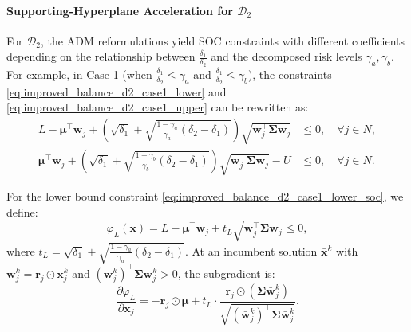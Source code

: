 \documentclass[preprint,12pt,authoryear]{elsarticle}
\begin{document}
\paragraph{Supporting-Hyperplane Acceleration for $\mathcal{D}_2$}
For $\mathcal{D}_2$, the ADM reformulations yield SOC constraints with different coefficients depending on the relationship between $\frac{\delta_1}{\delta_2}$ and the decomposed risk levels $\gamma_a, \gamma_b$. For example, in Case 1 (when $\frac{\delta_1}{\delta_2} \leqslant \gamma_a$ and $\frac{\delta_1}{\delta_2} \leqslant \gamma_b$), the constraints \eqref{eq:improved_balance_d2_case1_lower} and \eqref{eq:improved_balance_d2_case1_upper} can be rewritten as:
\begin{align}
L - \boldsymbol{\mu}^\top \mathbf{w}_j + \left(\sqrt{\delta_1} + \sqrt{\frac{1 - \gamma_a}{\gamma_a} (\delta_2 - \delta_1)}\right) \sqrt{\mathbf{w}_j^\top \boldsymbol{\Sigma} \mathbf{w}_j} &\leqslant 0, \quad \forall j \in N, \label{eq:improved_balance_d2_case1_lower_soc} \\
\boldsymbol{\mu}^\top \mathbf{w}_j + \left(\sqrt{\delta_1} + \sqrt{\frac{1 - \gamma_b}{\gamma_b} (\delta_2 - \delta_1)}\right) \sqrt{\mathbf{w}_j^\top \boldsymbol{\Sigma} \mathbf{w}_j} - U &\leqslant 0, \quad \forall j \in N. \label{eq:improved_balance_d2_case1_upper_soc}
\end{align}

For the lower bound constraint \eqref{eq:improved_balance_d2_case1_lower_soc}, we define:
\begin{equation}
\varphi_L(\mathbf{x}) = L - \boldsymbol{\mu}^\top \mathbf{w}_j + t_L \sqrt{\mathbf{w}_j^\top \boldsymbol{\Sigma} \mathbf{w}_j} \leqslant 0,
\end{equation}
where $t_L = \sqrt{\delta_1} + \sqrt{\frac{1 - \gamma_a}{\gamma_a} (\delta_2 - \delta_1)}$. At an incumbent solution $\bar{\mathbf{x}}^k$ with $\bar{\mathbf{w}}_j^k = \mathbf{r}_j \odot \bar{\mathbf{x}}_j^k$ and $(\bar{\mathbf{w}}_j^k)^\top \boldsymbol{\Sigma} \bar{\mathbf{w}}_j^k > 0$, the subgradient is:
\begin{equation}
\frac{\partial \varphi_L}{\partial \mathbf{x}_j} = -\mathbf{r}_j \odot \boldsymbol{\mu} + t_L \cdot \frac{\mathbf{r}_j \odot (\boldsymbol{\Sigma} \bar{\mathbf{w}}_j^k)}{\sqrt{(\bar{\mathbf{w}}_j^k)^\top \boldsymbol{\Sigma} \bar{\mathbf{w}}_j^k}}.
\label{eq:improved_d2_subgradient_L}
\end{equation}
\end{document}
